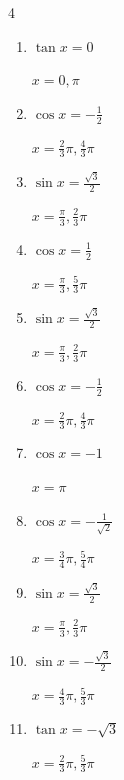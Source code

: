 \begin{multicols}{4}
\begin{enumerate}
        $\displaystyle x = \frac{5}{6}\pi , \frac{7}{6}\pi$

  \item $\displaystyle \tan{x}  = 0$

        $\displaystyle x = 0 , \pi$

  \item $\displaystyle \cos{x}  = -\frac{1}{2}$

        $\displaystyle x = \frac{2}{3}\pi , \frac{4}{3}\pi$

  \item $\displaystyle \sin{x}  = \frac{\sqrt{3}}{2}$

        $\displaystyle x = \frac{\pi}{3} , \frac{2}{3}\pi$

\columnbreak %

  \item $\displaystyle \cos{x}  = \frac{1}{2}$

        $\displaystyle x = \frac{\pi}{3} , \frac{5}{3}\pi$

  \item $\displaystyle \sin{x}  = \frac{\sqrt{3}}{2}$

        $\displaystyle x = \frac{\pi}{3} , \frac{2}{3}\pi$

  \item $\displaystyle \cos{x}  = -\frac{1}{2}$

        $\displaystyle x = \frac{2}{3}\pi , \frac{4}{3}\pi$

  \item $\displaystyle \cos{x}  = -1$

        $\displaystyle x = \pi$

  \item $\displaystyle \cos{x}  = -\frac{1}{\sqrt{2}}$

        $\displaystyle x = \frac{3}{4}\pi , \frac{5}{4}\pi$

  \item $\displaystyle \sin{x}  = \frac{\sqrt{3}}{2}$

        $\displaystyle x = \frac{\pi}{3} , \frac{2}{3}\pi$

  \item $\displaystyle \sin{x}  = -\frac{\sqrt{3}}{2}$

        $\displaystyle x = \frac{4}{3}\pi , \frac{5}{3}\pi$

  \item $\displaystyle \tan{x}  = -\sqrt{3}$

        $\displaystyle x = \frac{2}{3}\pi , \frac{5}{3}\pi$


\end{enumerate}
\end{multicols}
